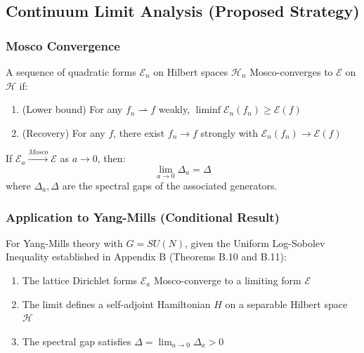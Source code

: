 \subsection{Continuum Limit Analysis (Proposed Strategy)}

\subsubsection{Mosco Convergence}

\begin{definition}
A sequence of quadratic forms $\mathcal{E}_n$ on Hilbert spaces $\mathcal{H}_n$ Mosco-converges to $\mathcal{E}$ on $\mathcal{H}$ if:
\begin{enumerate}
    \item (Lower bound) For any $f_n \rightharpoonup f$ weakly, $\liminf \mathcal{E}_n(f_n) \geq \mathcal{E}(f)$
    \item (Recovery) For any $f$, there exist $f_n \to f$ strongly with $\mathcal{E}_n(f_n) \to \mathcal{E}(f)$
\end{enumerate}
\end{definition}

\begin{theorem}\label{thm:mosco-spectral-hard}
If $\mathcal{E}_a \xrightarrow{Mosco} \mathcal{E}$ as $a \to 0$, then:
\begin{equation}
    \lim_{a \to 0} \Delta_a = \Delta
\end{equation}
where $\Delta_a, \Delta$ are the spectral gaps of the associated generators.
\end{theorem}

\subsubsection{Application to Yang-Mills (Conditional Result)}

\begin{theorem}\label{thm:continuum-existence-hard}
For Yang-Mills theory with $G = SU(N)$, given the Uniform Log-Sobolev Inequality established in Appendix B (Theorems B.10 and B.11):
\begin{enumerate}
    \item The lattice Dirichlet forms $\mathcal{E}_a$ Mosco-converge to a limiting form $\mathcal{E}$
    \item The limit defines a self-adjoint Hamiltonian $H$ on a separable Hilbert space $\mathcal{H}$
    \item The spectral gap satisfies $\Delta = \lim_{a \to 0} \Delta_a > 0$
\end{enumerate}
\end{theorem}

